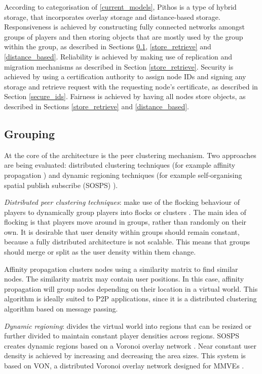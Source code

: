 \documentclass[10pt,a4paper,conference]{IEEEtran}
\begin{document}
According to categorisation of \ref{current_models}, Pithos is a type of hybrid storage, that incorporates overlay storage and distance-based
storage. Responsiveness is achieved by constructing fully connected networks amongst groups of players and then storing objects that are mostly used
by the group within the group, as described in Sections \ref{grouping}, \ref{store_retrieve} and \ref{distance_based}. Reliability is achieved by
making use of replication and migration mechanisms as described in Section \ref{store_retrieve}. Security is achieved by using a certification
authority to assign node IDs and signing any storage and retrieve request with the requesting node's certificate, as described in Section
\ref{secure_ids}. Fairness is achieved by having all nodes store objects, as described in Sections \ref{store_retrieve} and \ref{distance_based}.

\subsection{Grouping}
\label{grouping}

At the core of the architecture is the peer clustering mechanism. Two approaches are being evaluated: distributed clustering techniques (for example
affinity propagation \cite{affinity_propagation}) and dynamic regioning techniques (for example self-organising spatial publish subscribe (SOSPS)
\cite{self_organising_sps_post}).

\emph{Distributed peer clustering techniques}: make use of the flocking behaviour of players to dynamically group players into flocks or clusters
\cite{flocking}. The main idea of flocking is that players move around in groups, rather than randomly on their own. It is desirable that user
density within groups should remain constant, because a fully distributed architecture is not scalable. This means that groups should merge or split
as the user density within them change.

Affinity propagation clusters nodes using a similarity matrix to find similar nodes. The similarity matrix may contain user positions. In this case,
affinity propagation will group nodes depending on their location in a virtual world. This algorithm is ideally suited to P2P applications, since it
is a distributed clustering algorithm based on message passing.

\emph{Dynamic regioning}: divides the virtual world into regions that can be resized or further divided to maintain constant player densities across
regions. SOSPS creates dynamic regions based on a Voronoi overlay network \cite{voronoi_diagrams_survey}. Near constant user density is achieved by
increasing and decreasing the area sizes. This system is based on VON, a distributed Voronoi overlay network designed for MMVEs \cite{VON_VAST}.
\end{document}
